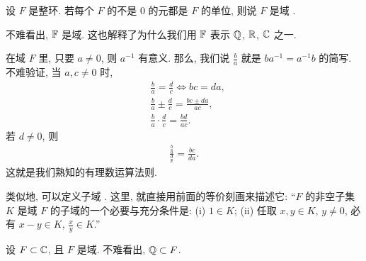 \begin{definition}
    设 $F$ 是整环. 若每个 $F$ 的不是 $0$ 的元都是 $F$ 的单位, 则说 $F$ 是域 .
\end{definition}

\begin{example}
    不难看出, $\mathbb{F}$ 是域. 这也解释了为什么我们用 $\mathbb{F}$ 表示 $\mathbb{Q}$, $\mathbb{R}$, $\mathbb{C}$ 之一.
\end{example}

\begin{remark}
    在域 $F$ 里, 只要 $a \neq 0$, 则 $a^{-1}$ 有意义. 那么, 我们说 $\frac{b}{a}$ 就是 $ba^{-1} = a^{-1}b$ 的简写. 不难验证, 当 $a,c \neq 0$ 时,
    \begin{align*}
         & \frac{b}{a} = \frac{d}{c} \iff bc = da,             \\
         & \frac{b}{a} \pm \frac{d}{c} = \frac{bc \pm da}{ac}, \\
         & \frac{b}{a} \cdot \frac{d}{c} = \frac{bd}{ac}.
    \end{align*}
    若 $d \neq 0$, 则
    \begin{align*}
        \frac{\frac{b}{a}}{\frac{d}{c}} = \frac{bc}{da}.
    \end{align*}
    这就是我们熟知的有理数运算法则.
\end{remark}

\begin{remark}
    类似地, 可以定义子域 . 这里, 就直接用前面的等价刻画来描述它: ``$F$ 的非空子集 $K$ 是域 $F$ 的子域的一个必要与充分条件是: (i) $1 \in K$; (ii) 任取 $x,y \in K$, $y \neq 0$, 必有 $x-y \in K$, $\frac{x}{y} \in K$.''
\end{remark}

\begin{example}
    设 $F \subset \mathbb{C}$, 且 $F$ 是域. 不难看出, $\mathbb{Q} \subset F$.
\end{example}
